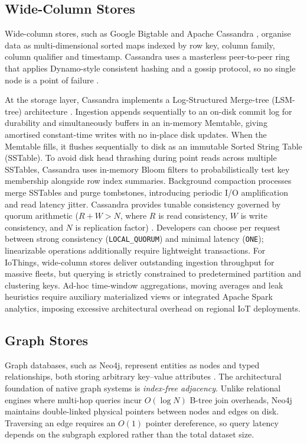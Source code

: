 \documentclass[11pt,a4paper]{article}
\begin{document}
\subsection{Wide-Column Stores}
Wide-column stores, such as Google Bigtable \citep{chang2008} and Apache Cassandra \citep{lakshman2010}, organise data as multi-dimensional sorted maps indexed by row key, column family, column qualifier and timestamp. Cassandra uses a masterless peer-to-peer ring that applies Dynamo-style consistent hashing and a gossip protocol, so no single node is a point of failure \citep{lakshman2010,decandia2007}.

At the storage layer, Cassandra implements a Log-Structured Merge-tree (LSM-tree) architecture \citep{oneil1996}. Ingestion appends sequentially to an on-disk commit log for durability and simultaneously buffers in an in-memory Memtable, giving amortised constant-time writes with no in-place disk updates. When the Memtable fills, it flushes sequentially to disk as an immutable Sorted String Table (SSTable). To avoid disk head thrashing during point reads across multiple SSTables, Cassandra uses in-memory Bloom filters to probabilistically test key membership alongside row index summaries. Background compaction processes merge SSTables and purge tombstones, introducing periodic I/O amplification and read latency jitter. Cassandra provides tunable consistency governed by quorum arithmetic ($R + W > N$, where $R$ is read consistency, $W$ is write consistency, and $N$ is replication factor) \citep{decandia2007}. Developers can choose per request between strong consistency (\texttt{LOCAL\_QUORUM}) and minimal latency (\texttt{ONE}); linearizable operations additionally require lightweight transactions. For IoThings, wide-column stores deliver outstanding ingestion throughput for massive fleets, but querying is strictly constrained to predetermined partition and clustering keys. Ad-hoc time-window aggregations, moving averages and leak heuristics require auxiliary materialized views or integrated Apache Spark analytics, imposing excessive architectural overhead on regional IoT deployments.

\subsection{Graph Stores}
Graph databases, such as Neo4j, represent entities as nodes and typed relationships, both storing arbitrary key--value attributes \citep{robinson2015}. The architectural foundation of native graph systems is \emph{index-free adjacency}. Unlike relational engines where multi-hop queries incur $O(\log N)$ B-tree join overheads, Neo4j maintains double-linked physical pointers between nodes and edges on disk. Traversing an edge requires an $O(1)$ pointer dereference, so query latency depends on the subgraph explored rather than the total dataset size.
\end{document}
